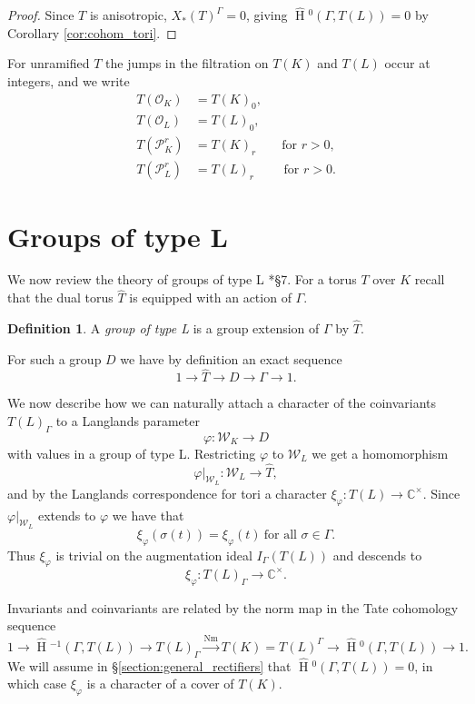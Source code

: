 \documentclass{mrlart7}
\theoremstyle{plain}
\newcommand{\HT}[1]{\hat{\HH}{}^{#1}}
\theoremstyle{definition}
\newtheorem{definition}[theorem]{Definition}
\numberwithin{equation}{section}
\DeclareMathOperator{\HH}{H}
\DeclareMathOperator{\Nm}{Nm}
\newcommand{\CCx}{\mathbb{C}^\times}
\newcommand{\OK}{\mathcal{O}_K}
\newcommand{\PK}{\mathcal{P}_K}
\newcommand{\PL}{\mathcal{P}_L}
\newcommand{\OL}{\mathcal{O}_L}
\newcommand{\Weil}{\mathcal{W}}
\begin{document}
\begin{proof}
Since $T$ is anisotropic, $X_*(T)^{\Gamma} = 0$, giving $\HT{0}(\Gamma, T(L)) = 0$ by Corollary
\ref{cor:cohom_tori}.
\end{proof}

For unramified $T$ the jumps in the filtration on $T(K)$ and $T(L)$ occur at integers, and we write
\begin{align*}
T(\OK) &= T(K)_0, \\
T(\OL) &= T(L)_0, \\
T(\PK^r) &= T(K)_r\qquad \mbox{for $r > 0$}, \\
T(\PL^r) &= T(L)_r\qquad\,\,\mbox{for $r > 0$}.
\end{align*}

\section{Groups of type L} \label{section:groups_of_type_L}

We now review the theory of groups of type L \cite{roe:13a}*{\S 7}.
For a torus $T$ over $K$ recall that the dual torus $\hat{T}$ is equipped with
an action of $\Gamma$.

\begin{definition}
A \emph{group of type L} is a group extension of $\Gamma$ by $\hat{T}$.
\end{definition}

For such a group $D$ we have by definition an exact sequence
$$1 \rightarrow \hat{T} \rightarrow D \rightarrow \Gamma \rightarrow 1.$$

We now describe how we can naturally attach a character of the coinvariants
$T(L)_{\Gamma}$ to a Langlands parameter
$$\varphi : \Weil_K \rightarrow D$$
with values in a group of type L.
Restricting $\varphi$ to $\Weil_L$ we get a homomorphism
$$\varphi|_{\Weil_L} : \Weil_L \rightarrow \hat{T},$$
and by the Langlands correspondence for tori a character
$\xi_{\varphi} : T(L) \rightarrow \CCx$.  Since $\varphi|_{\Weil_L}$ extends
to $\varphi$ we have that
$$\xi_{\varphi}(\sigma(t)) = \xi_{\varphi}(t)\ \mbox{for all $\sigma \in \Gamma$.}$$
Thus $\xi_{\varphi}$ is trivial on the augmentation ideal $I_{\Gamma}(T(L))$
and descends to $$\xi_{\varphi} : T(L)_\Gamma \rightarrow \CCx.$$

Invariants
and coinvariants are related by the norm map
in the Tate cohomology sequence
$$1 \rightarrow \HT{-1}(\Gamma,T(L)) \rightarrow T(L)_{\Gamma} \xrightarrow{\Nm} T(K)
  = T(L)^{\Gamma} \rightarrow \HT{0}(\Gamma,T(L)) \rightarrow 1.$$
We will assume in \S \ref{section:general_rectifiers} that $\HT{0}(\Gamma,T(L)) = 0$, in which case
$\xi_\varphi$ is a character of a cover of $T(K)$.
\end{document}
